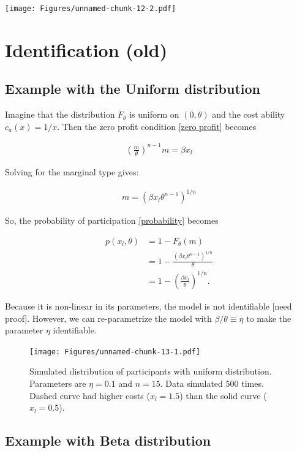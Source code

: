 \documentclass[]{article}
\begin{document}
\texttt{[image: Figures/unnamed-chunk-12-2.pdf]}

\section{Identification (old)}\label{identification-old}

\subsection{Example with the Uniform
distribution}\label{example-with-the-uniform-distribution}

Imagine that the distribution \(F_\theta\) is uniform on \((0, \theta)\)
and the cost ability \(c_a(x) = 1/x\). Then the zero profit condition
\eqref{zero profit} becomes

\begin{align}
    \left(\frac{m}{\theta}\right)^{n-1} m = \beta x_l 
\end{align}

Solving for the marginal type gives:

\begin{align}
    m = \left(\beta x_l  \theta^{n-1}\right)^{1/n}
\end{align}

So, the probability of participation \eqref{probability} becomes

\begin{align}
    p(x_l, \theta) 
        & = 1 - F_\theta(m) \\
        & = 1 - \frac{\left(\beta x_l \theta^{n-1}\right)^{1/n} }{\theta} \\
        & = 1 - \left(\frac{\beta x_l}{\theta}\right)^{1/n}.
\end{align}

Because it is non-linear in its parameters, the model is not
identifiable {[}need proof{]}. However, we can re-parametrize the model
with \(\beta/\theta \equiv \eta\) to make the parameter \(\eta\)
identifiable.

\begin{figure}
\centering
\texttt{[image: Figures/unnamed-chunk-13-1.pdf]}
\caption{Simulated distribution of participants with uniform
distribution. Parameters are \(\eta=0.1\) and \(n=15\). Data simulated
500 times. Dashed curve had higher costs (\(x_l=1.5\)) than the solid
curve (\(x_l=0.5\)).}
\end{figure}

\subsection{Example with Beta
distribution}\label{example-with-beta-distribution}
\end{document}
